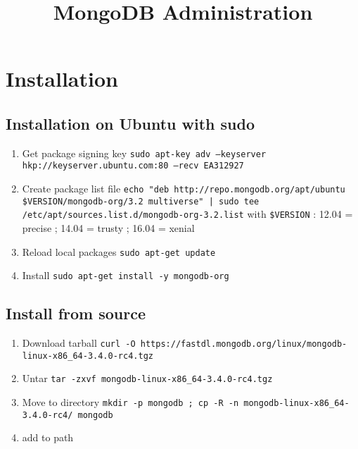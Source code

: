 


\title{MongoDB Administration\bigskip
}
\author{}
\date{}


\maketitle

\justify



\section*{Installation}

\subsection*{Installation on Ubuntu with sudo}

\begin{enumerate}
\item Get package signing key
\texttt{sudo apt-key adv --keyserver hkp://keyserver.ubuntu.com:80 --recv EA312927}
\item Create package list file
\texttt{echo "deb http://repo.mongodb.org/apt/ubuntu {\$}VERSION/mongodb-org/3.2 multiverse" | sudo tee /etc/apt/sources.list.d/mongodb-org-3.2.list} with \texttt{{\$}VERSION} : 12.04 = precise ; 14.04 = trusty ; 16.04 = xenial
\item Reload local packages \texttt{sudo apt-get update}
\item Install \texttt{sudo apt-get install -y mongodb-org}
\end{enumerate}


\subsection*{Install from source}

\begin{enumerate}
\item Download tarball \texttt{curl -O https://fastdl.mongodb.org/linux/mongodb-linux-x86{\_}64-3.4.0-rc4.tgz}
\item Untar \texttt{tar -zxvf mongodb-linux-x86{\_}64-3.4.0-rc4.tgz}
\item Move to directory \texttt{mkdir -p mongodb ; cp -R -n mongodb-linux-x86{\_}64-3.4.0-rc4/ mongodb}
\item add to path
\end{enumerate}




